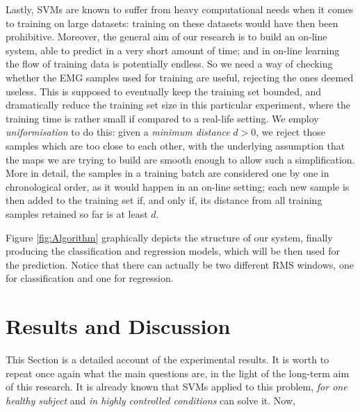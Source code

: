 \documentclass[10pt]{bmc_article}
\newenvironment{bmcformat}{\begin{raggedright}\baselineskip20pt\sloppy\setboolean{publ}{false}}{\end{raggedright}\baselineskip20pt\sloppy}
\begin{document}
\begin{bmcformat}
Lastly, SVMs are known to suffer from heavy computational needs when
it comes to training on large datasets: training on these datasets
would have then been prohibitive. Moreover, the general aim of our
research is to build an on-line system, able to predict in a very
short amount of time; and in on-line learning the flow of training
data is potentially endless. So we need a way of checking whether the
EMG samples used for training are useful, rejecting the ones deemed
useless. This is supposed to eventually keep the training set bounded,
and dramatically reduce the training set size in this particular
experiment, where the training time is rather small if compared to a
real-life setting. We employ \emph{uniformisation}
\cite{2008.ICRA,2008.BioCyb} to do this: given a \emph{minimum
distance} $d > 0$, we reject those samples which are too close to each
other, with the underlying assumption that the maps we are trying to
build are smooth enough to allow such a simplification. More in
detail, the samples in a training batch are considered one by one in
chronological order, as it would happen in an on-line setting; each
new sample is then added to the training set if, and only if, its
distance from all training samples retained so far is at least
$d$.


Figure \ref{fig:Algorithm} graphically depicts the structure of our
system, finally producing the classification and regression models,
which will be then used for the prediction. Notice that there can
actually be two different RMS windows, one for classification and one
for regression.

\section*{Results and Discussion}
\label{sec:exp}

This Section is a detailed account of the experimental results. It is
worth to repeat once again what the main questions are, in the light
of the long-term aim of this research. It is already known that SVMs
applied to this problem, \emph{for one healthy subject} and \emph{in
highly controlled conditions} can solve it. Now,


\end{bmcformat}
\end{document}

